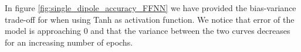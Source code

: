 \documentclass[a4paper, UKenglish, 11pt]{uiomaster}
\begin{document}
In figure \ref{fig:single_dipole_accuracy_FFNN} we have provided the bias-variance trade-off for when using Tanh as activation function. We notice that error of the model is approaching 0 and that the variance between the two curves decreases for an increasing number of epochs.



\end{document}
